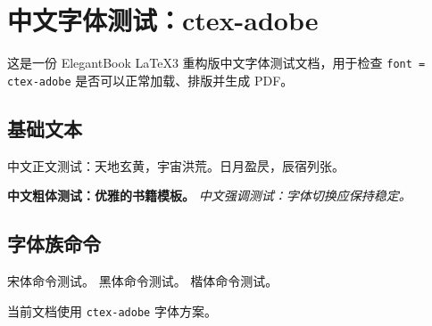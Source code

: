 \documentclass[lang = cn, font = ctex-adobe, mode = simple]{elegantbook-l3}
\begin{document}
\frontmatter
\tableofcontents

\mainmatter
\chapter{中文字体测试：ctex-adobe}

这是一份 ElegantBook LaTeX3 重构版中文字体测试文档，用于检查
\texttt{font = ctex-adobe} 是否可以正常加载、排版并生成 PDF。

\section{基础文本}

中文正文测试：天地玄黄，宇宙洪荒。日月盈昃，辰宿列张。

\textbf{中文粗体测试：优雅的书籍模板。}
\emph{中文强调测试：字体切换应保持稳定。}

\section{字体族命令}

{\songti 宋体命令测试。}
{\heiti 黑体命令测试。}
{\kaishu 楷体命令测试。}

\begin{theorem}[字体方案]
  当前文档使用 \texttt{ctex-adobe} 字体方案。
\end{theorem}
\end{document}
